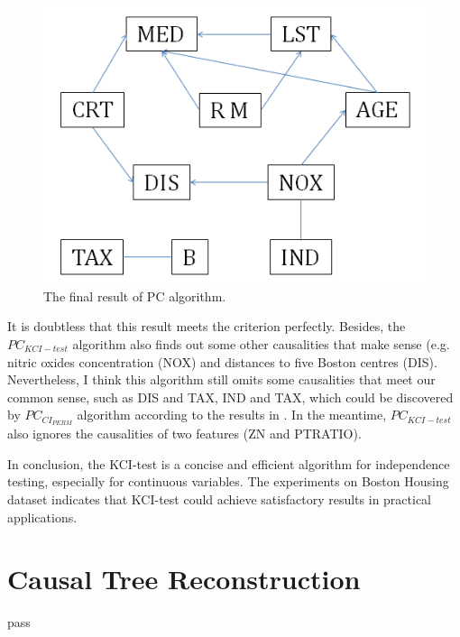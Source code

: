 \documentclass[12pt,a4paper]{article}
\theoremstyle{definition}
\begin{document}
\begin{figure}[H]
	\centering
	\includegraphics[width=0.7\linewidth]{img/res.png}
	\caption{The final result of PC algorithm.}
	\label{fig:pc-res}
\end{figure}

It is doubtless that this result meets the criterion perfectly. Besides, the $PC_{KCI-test}$ algorithm also finds out some other causalities that make sense (e.g. nitric oxides concentration (NOX) and distances to five Boston centres (DIS). Nevertheless, I think this algorithm still omits some causalities that meet our common sense, such as DIS and TAX, IND and TAX, which could be discovered by $PC_{CI_{PERM}}$ algorithm according to the results in \cite{alg}. In the meantime, $PC_{KCI-test}$ also ignores the causalities of two features (ZN and PTRATIO).

In conclusion, the KCI-test is a concise and efficient algorithm for independence testing, especially for continuous variables. The experiments on Boston Housing dataset indicates that KCI-test could achieve satisfactory results in practical applications.

\section{Causal Tree Reconstruction}

pass
\end{document}
